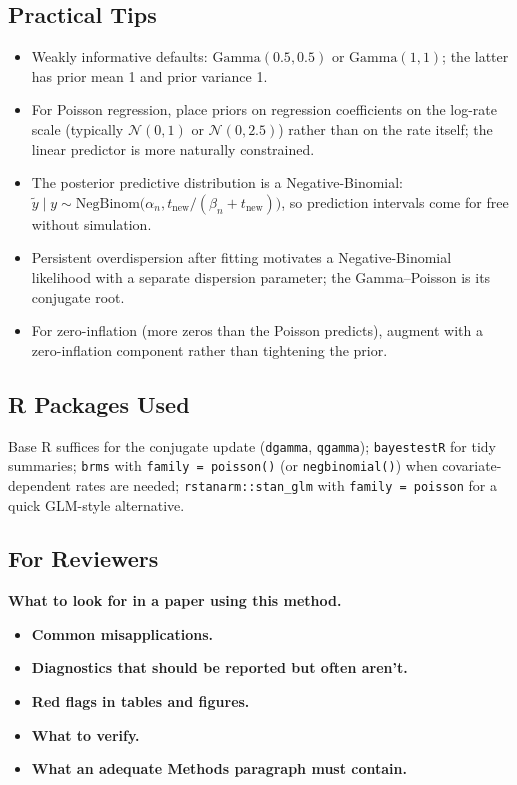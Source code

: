 \documentclass[
]{article}
\providecommand{\tightlist}{%
  \setlength{\itemsep}{0pt}\setlength{\parskip}{0pt}}
\begin{document}
\subsection{Practical Tips}\label{practical-tips}

\begin{itemize}
\tightlist
\item
  Weakly informative defaults: \(\mathrm{Gamma}(0.5, 0.5)\) or
  \(\mathrm{Gamma}(1, 1)\); the latter has prior mean 1 and prior
  variance 1.
\item
  For Poisson regression, place priors on regression coefficients on the
  log-rate scale (typically \(\mathcal N(0, 1)\) or
  \(\mathcal N(0, 2.5)\)) rather than on the rate itself; the linear
  predictor is more naturally constrained.
\item
  The posterior predictive distribution is a Negative-Binomial:
  \(\tilde y \mid y \sim \mathrm{NegBinom}\bigl(\alpha_n, t_{\text{new}} / (\beta_n + t_{\text{new}})\bigr)\),
  so prediction intervals come for free without simulation.
\item
  Persistent overdispersion after fitting motivates a Negative-Binomial
  likelihood with a separate dispersion parameter; the Gamma--Poisson is
  its conjugate root.
\item
  For zero-inflation (more zeros than the Poisson predicts), augment
  with a zero-inflation component rather than tightening the prior.
\end{itemize}

\subsection{R Packages Used}\label{r-packages-used}

Base R suffices for the conjugate update (\texttt{dgamma},
\texttt{qgamma}); \texttt{bayestestR} for tidy summaries; \texttt{brms}
with \texttt{family\ =\ poisson()} (or \texttt{negbinomial()}) when
covariate-dependent rates are needed; \texttt{rstanarm::stan\_glm} with
\texttt{family\ =\ poisson} for a quick GLM-style alternative.

\subsection{For Reviewers}\label{for-reviewers}

\textbf{What to look for in a paper using this method.}

\begin{itemize}
\tightlist
\item
  \textbf{Common misapplications.}
\item
  \textbf{Diagnostics that should be reported but often aren't.}
\item
  \textbf{Red flags in tables and figures.}
\item
  \textbf{What to verify.}
\item
  \textbf{What an adequate Methods paragraph must contain.}
\end{itemize}
\end{document}
